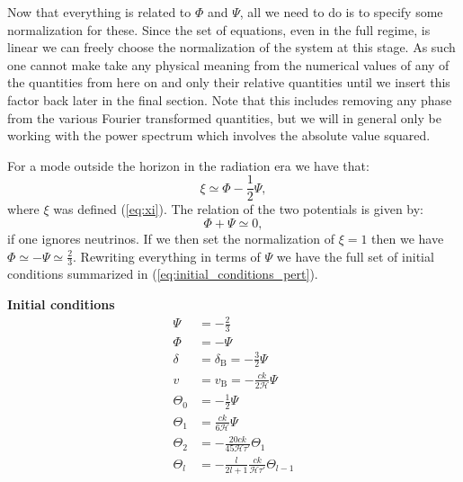 \documentclass[%
reprint,
 amsmath,amssymb,
 aps,
]{revtex4-2}
\newcommand{\Hp}{\mathcal{H}}
\begin{document}
Now that everything is related to $\Phi$ and $\Psi$, all we need to do is to specify some normalization for these. Since the set of equations, even in the full regime, is linear we can freely choose the normalization of the system at this stage. As such one cannot make take any physical meaning from the numerical values of any of the quantities from here on and only their relative quantities until we insert this factor back later in the final section. Note that this includes removing any phase from the various Fourier transformed quantities, but we will in general only be working with the power spectrum which involves the absolute value squared. 

For a mode outside the horizon in the radiation era we have that:
\[\xi\simeq\Phi-\frac{1}{2}\Psi,\]
where $\xi$ was defined (\ref{eq:xi}). The relation of the two potentials is given by: \cite{Dodelson:2003ft} 
\[\Phi+\Psi\simeq0,\]
if one ignores neutrinos. If we then set the normalization of $\xi=1$ then we have $\Phi\simeq-\Psi\simeq\frac{2}{3}$. Rewriting everything in terms of $\Psi$ we have the full set of initial conditions summarized in (\ref{eq:initial_conditions_pert}).


\begin{center}
\begin{tcolorbox}[
	width=0.7\linewidth,
	colback=black!3!white,
	]
	\textbf{Initial conditions}
	\begin{subequations}\label{eq:initial_conditions_pert}
		\begin{align}
			\Psi&=-\frac{2}{3}\\
			\Phi&=-\Psi\\
			\delta&=\delta_\text{B}=-\frac{3}{2}\Psi\\
			v&=v_\text{B}=-\frac{ck}{2\Hp}\Psi\\
			\Theta_0&=-\frac{1}{2}\Psi\\
			\Theta_1&=\frac{ck}{6\Hp}\Psi\\
			\Theta_2&=-\frac{20ck}{45\Hp\tau'}\Theta_1\\
			\Theta_l&=-\frac{l}{2l+1}\frac{ck}{\Hp\tau'}\Theta_{l-1}
		\end{align}
	\end{subequations}
\end{tcolorbox}
\end{center}
\end{document}
